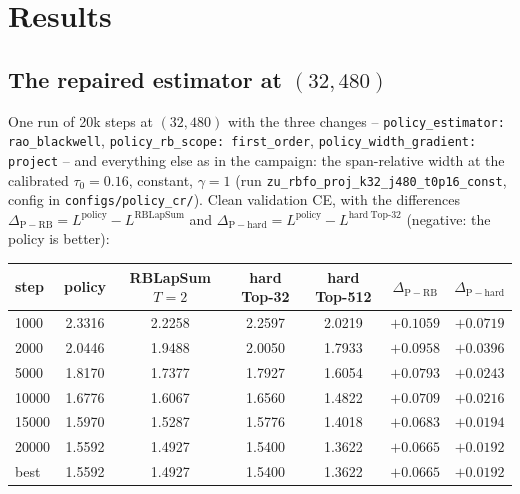 \documentclass[11pt,a4paper]{article}
\newcommand{\code}[1]{\texttt{#1}}
\begin{document}
\section{Results}
\label{sec:results}

\subsection*{The repaired estimator at $(32, 480)$}

One run of 20k steps at $(32, 480)$ with the three changes --
\code{policy\_estimator: rao\_blackwell}, \code{policy\_rb\_scope: first\_order},
\code{policy\_width\_gradient: project} -- and everything else as in the
campaign: the span-relative width at the calibrated $\tau_0 = 0.16$, constant,
$\gamma = 1$ (run \code{zu\_rbfo\_proj\_k32\_j480\_t0p16\_const}, config in
\code{configs/policy\_cr/}). Clean validation CE, with the
differences $\Delta_{\mathrm{P-RB}} = L^{\mathrm{policy}} - L^{\mathrm{RBLapSum}}$
and $\Delta_{\mathrm{P-hard}} = L^{\mathrm{policy}} - L^{\mathrm{hard\ Top\text{-}32}}$
(negative: the policy is better):

\begin{center}\small
\begin{tabular}{lcccccc}
\toprule
step & policy & RBLapSum $T{=}2$ & hard Top-32 & hard Top-512 & $\Delta_{\mathrm{P-RB}}$ & $\Delta_{\mathrm{P-hard}}$ \\
\midrule
1000 & 2.3316 & 2.2258 & 2.2597 & 2.0219 & $+0.1059$ & $+0.0719$ \\
2000 & 2.0446 & 1.9488 & 2.0050 & 1.7933 & $+0.0958$ & $+0.0396$ \\
5000 & 1.8170 & 1.7377 & 1.7927 & 1.6054 & $+0.0793$ & $+0.0243$ \\
10000 & 1.6776 & 1.6067 & 1.6560 & 1.4822 & $+0.0709$ & $+0.0216$ \\
15000 & 1.5970 & 1.5287 & 1.5776 & 1.4018 & $+0.0683$ & $+0.0194$ \\
20000 & 1.5592 & 1.4927 & 1.5400 & 1.3622 & $+0.0665$ & $+0.0192$ \\
\midrule
best & 1.5592 & 1.4927 & 1.5400 & 1.3622 & $+0.0665$ & $+0.0192$ \\
\bottomrule
\end{tabular}
\end{center}
\end{document}
